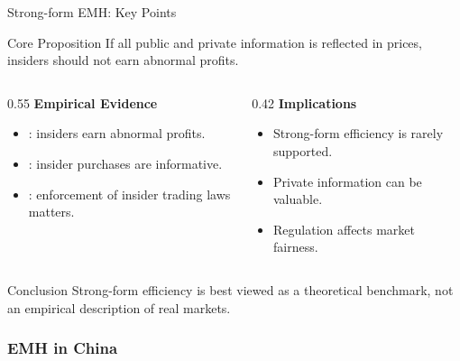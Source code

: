\begin{frame}{Strong-form EMH: Key Points}
\footnotesize
\begin{block}{Core Proposition}
If all public and private information is reflected in prices, 
\alert{insiders should not earn abnormal profits}.
\end{block}

\begin{columns}[T]
    \begin{column}{0.55\textwidth}
        \textbf{Empirical Evidence}
        \begin{itemize}
            \item \textcite{seyhun1986insiders}: insiders earn abnormal profits.
            \item \textcite{lakonishok2001are}: insider purchases are informative.
            \item \textcite{bhattacharya2002world}: enforcement of insider trading laws matters.
        \end{itemize}
    \end{column}
    
    \begin{column}{0.42\textwidth}
        \textbf{Implications}
        \begin{itemize}
            \item Strong-form efficiency is rarely supported.
            \item Private information can be valuable.
            \item Regulation affects market fairness.
        \end{itemize}
    \end{column}
\end{columns}

\vfill

\begin{alertblock}{Conclusion}
Strong-form efficiency is best viewed as a theoretical benchmark, not an empirical description of real markets.
\end{alertblock}

\end{frame}

\subsubsection{EMH in China}

